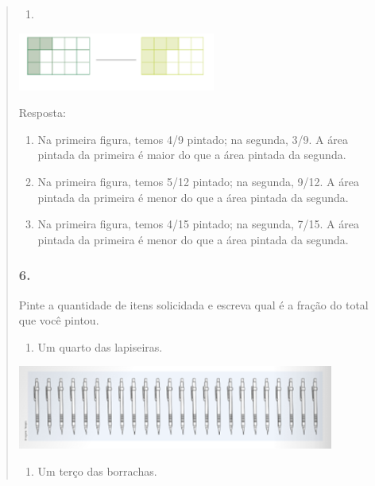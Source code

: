 \begin{enumerate}
\begin{escolha}
\begin{enumerate}
\begin{itemize}
\begin{itemize}
\begin{escolha}
\begin{quote}
\begin{escolha}
{\begin{enumerate}
\def\labelenumi{\alph{enumi})}
\item
\end{enumerate}

\includegraphics[width=2.55022in,height=0.75006in]{media/image110.png}

Resposta:

\begin{enumerate}
\def\labelenumi{\alph{enumi})}
\item
  Na primeira figura, temos 4/9 pintado; na segunda, 3/9. A
  área pintada da primeira é maior do que a área pintada da segunda.
\item
  Na primeira figura, temos 5/12 pintado; na segunda, 9/12. A área pintada da primeira é menor do que a área pintada da segunda.
\item
  Na primeira figura, temos 4/15 pintado; na segunda, 7/15. A área pintada da primeira é menor do que a área pintada da segunda.
\end{enumerate}

\subsubsection{6. }\label{section-109}

Pinte a quantidade de itens solicidada e
escreva qual é a fração do total que você pintou.

\begin{enumerate}
\def\labelenumi{\alph{enumi})}
\item
  Um quarto das lapiseiras.
\end{enumerate}

\includegraphics[width=4.09202in,height=1.08343in]{media/image111.png}


\begin{enumerate}
\def\labelenumi{\alph{enumi})}
\item
  Um terço das borrachas.
\end{enumerate}

}
\end{escolha}
\end{quote}
\end{escolha}
\end{itemize}
\end{itemize}
\end{enumerate}
\end{escolha}
\end{enumerate}
